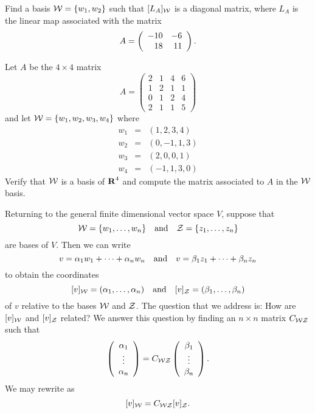 \begin{exercise} \label{c7.3.4}
Find a basis ${\cal W}=\{w_1,w_2\}$ such that $[L_A]_{\cal W}$ is
a diagonal matrix, where $L_A$ is the linear map associated with the
matrix
\[
A = \left(\begin{array}{rr} -10 & -6\\ 18 &11\end{array}\right).
\]
\end{exercise}

\begin{exercise} \label{c7.3.5}
Let $A$ be the $4\times 4$ matrix
\begin{equation*}
A = \left( \begin{array}{rrrr}
    2   &  1   &   4   &   6\\
     1  &    2   &   1  &    1\\
     0   &   1    &  2   &   4\\
     2    &  1   &   1   &   5
\end{array}\right)
\end{equation*}
and let ${\cal W}=\{w_1,w_2,w_3,w_4\}$ where
\begin{equation*}
\begin{array}{rcl}
w_1 & = &  ( 1, 2, 3, 4)  \\
w_2 & = &  ( 0,-1, 1, 3) \\
w_3 & = &  ( 2, 0, 0, 1) \\
w_4 & = &   (-1, 1,3, 0)
\end{array}
\end{equation*}
Verify that ${\cal W}$ is a basis of $\mbox{$\bf{R}$}^4$ and compute the
matrix associated to $A$ in the ${\cal W}$ basis.
\end{exercise}




  \label{MALT}
  


Returning to the general finite dimensional vector space $V$, suppose that
\[
{\cal W} = \{w_1,\ldots,w_n\} \quad\mbox{and}\quad {\cal Z} = \{z_1,\ldots,z_n\}
\]
are bases of $V$.  Then we can write
\[
v = \alpha_1 w_1 + \cdots + \alpha_n w_n \quad\mbox{and}\quad
v = \beta_1 z_1 + \cdots + \beta_n z_n
\]
to obtain the coordinates
\begin{equation}  \label{e:vincoords}
[v]_{\cal W} = (\alpha_1,\ldots,\alpha_n) \quad\mbox{and}\quad
[v]_{\cal Z} = (\beta_1,\ldots,\beta_n)
\end{equation}
of $v$ relative to the bases ${\cal W}$ and ${\cal Z}$.  The question that
we address is: How are $[v]_{\cal W}$ and $[v]_{\cal Z}$ related?  We answer
this question by finding an $n\times n$ matrix $C_{{\cal W}{\cal Z}}$ such that
\begin{equation} \label{e:coordchange}
\left(\begin{array}{c} \alpha_1 \\ \vdots \\ \alpha_{n}\end{array}\right) = C_{{\cal W}{\cal Z}} \left(\begin{array}{c} \beta_1 \\ \vdots \\ \beta_{n}\end{array}\right).
\end{equation}
We may rewrite  as
\begin{equation}  \label{e:coordchange2}
[v]_{\cal W} = C_{{\cal W}{\cal Z}}[v]_{\cal Z}.
\end{equation}

